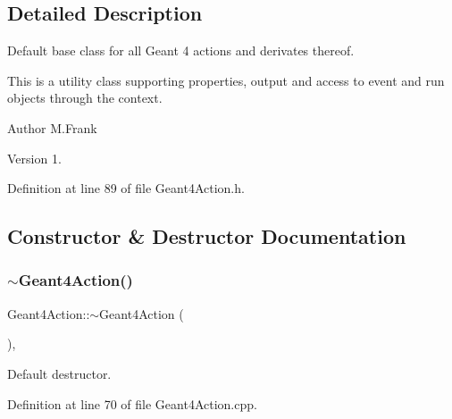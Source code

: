 \subsection{Detailed Description}
Default base class for all Geant 4 actions and derivates thereof. 

This is a utility class supporting properties, output and access to event and run objects through the context.

\begin{DoxyAuthor}{Author}
M.\+Frank 
\end{DoxyAuthor}
\begin{DoxyVersion}{Version}
1. 
\end{DoxyVersion}


Definition at line 89 of file Geant4\+Action.\+h.



\subsection{Constructor \& Destructor Documentation}
\hypertarget{class_d_d4hep_1_1_simulation_1_1_geant4_action_af1ba7438be6c70743727ce6606c5f76a}{}\label{class_d_d4hep_1_1_simulation_1_1_geant4_action_af1ba7438be6c70743727ce6606c5f76a} 
\subsubsection{\texorpdfstring{$\sim$\+Geant4\+Action()}{~Geant4Action()}}
{\footnotesize\ttfamily Geant4\+Action\+::$\sim$\+Geant4\+Action (\begin{DoxyParamCaption}{ }\end{DoxyParamCaption})\hspace{0.3cm}{\ttfamily [protected]}, {\ttfamily [virtual]}}



Default destructor. 



Definition at line 70 of file Geant4\+Action.\+cpp.

\hypertarget{class_d_d4hep_1_1_simulation_1_1_geant4_action_a030276e3d60d7da13a2339f0d87ed52e}{}\label{class_d_d4hep_1_1_simulation_1_1_geant4_action_a030276e3d60d7da13a2339f0d87ed52e} 
